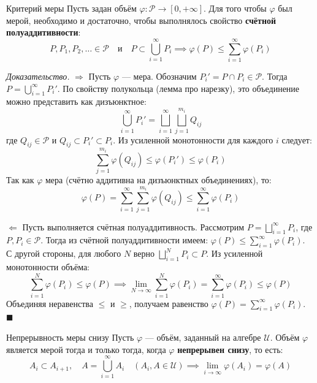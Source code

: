 \documentclass[12pt,a4paper]{article}
\newenvironment{Proof}[1][Доказательство]{\vspace{0.5em}\noindent\textit{#1.}\hspace{0.5em}\ignorespaces}{\hfill$\blacksquare$\vspace{1em}}
\begin{document}
\begin{Theorem}{Критерий меры}{}
Пусть задан объём $\varphi: \mathcal{P} \to [0, +\infty]$. Для того чтобы $\varphi$ был мерой, необходимо и достаточно, чтобы выполнялось свойство \textbf{счётной полуаддитивности}:
$$ P, P_1, P_2, \dots \in \mathcal{P} \quad \text{и} \quad P \subset \bigcup\limits_{i=1}^{\infty} P_i \implies \varphi(P) \le \sum\limits_{i=1}^{\infty} \varphi(P_i) $$
\end{Theorem}

\begin{Proof}
$\Rightarrow$ Пусть $\varphi$ — мера. Обозначим $P_i' = P \cap P_i \in \mathcal{P}$. Тогда $P = \bigcup\limits_{i=1}^{\infty} P_i'$. 
По свойству полукольца (лемма про нарезку), это объединение можно представить как дизъюнктное:
$$ \bigcup\limits_{i=1}^{\infty} P_i' = \bigsqcup\limits_{i=1}^{\infty} \bigsqcup\limits_{j=1}^{m_i} Q_{ij} $$
где $Q_{ij} \in \mathcal{P}$ и $Q_{ij} \subset P_i' \subset P_i$. Из усиленной монотонности для каждого $i$ следует:
$$ \sum\limits_{j=1}^{m_i} \varphi(Q_{ij}) \le \varphi(P_i') \le \varphi(P_i) $$
Так как $\varphi$ мера (счётно аддитивна на дизъюнктных объединениях), то:
$$ \varphi(P) = \sum\limits_{i=1}^{\infty} \sum\limits_{j=1}^{m_i} \varphi(Q_{ij}) \le \sum\limits_{i=1}^{\infty} \varphi(P_i) $$

$\Leftarrow$ Пусть выполняется счётная полуаддитивность. Рассмотрим $P = \bigsqcup\limits_{i=1}^{\infty} P_i$, где $P, P_i \in \mathcal{P}$. 
Тогда из счётной полуаддитивности имеем: $\varphi(P) \le \sum\limits_{i=1}^{\infty} \varphi(P_i)$. \\
С другой стороны, для любого $N$ верно $\bigsqcup\limits_{i=1}^N P_i \subset P$. Из усиленной монотонности объёма:
$$ \sum\limits_{i=1}^N \varphi(P_i) \le \varphi(P) \implies \lim\limits_{N \to \infty} \sum\limits_{i=1}^N \varphi(P_i) = \sum\limits_{i=1}^{\infty} \varphi(P_i) \le \varphi(P) $$
Объединяя неравенства $\le$ и $\ge$, получаем равенство $\varphi(P) = \sum\limits_{i=1}^{\infty} \varphi(P_i)$.
\end{Proof}

\begin{Theorem}{Непрерывность меры снизу}{}
Пусть $\varphi$ — объём, заданный на алгебре $\mathcal{U}$. Объём $\varphi$ является мерой тогда и только тогда, когда $\varphi$ \textbf{непрерывен снизу}, то есть:
$$ A_i \subset A_{i+1}, \quad A = \bigcup\limits_{i=1}^{\infty} A_i \quad (A_i, A \in \mathcal{U}) \implies \lim\limits_{i \to \infty} \varphi(A_i) = \varphi(A) $$
\end{Theorem}
\end{document}
